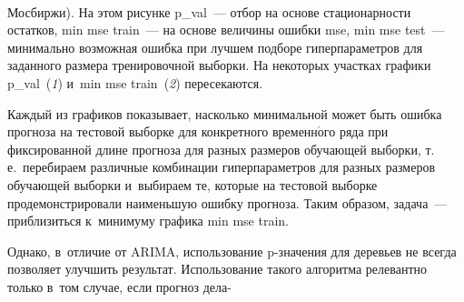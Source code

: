 \begin{figure*} %
\vspace*{9pt}
  \begin{center}  
    \mbox{%
\epsfxsize=102.865mm
}

\end{center}
\vspace*{-9pt}
    \label{pic2}
\end{figure*}

\begin{multicols}{2}

\noindent
 Мосбиржи). На этом рисунке p\_val~--- 
отбор на основе стационарности остатков, min mse train~--- на основе величины ошибки mse, min mse test~--- 
минимально возможная ошибка при лучшем подборе гиперпараметров для заданного размера тренировочной выборки. 
На некоторых участках графики p\_val~(\textit{1}) и~min mse train~(\textit{2}) пересекаются. 

Каждый из графиков показывает, 
насколько минимальной может быть ошибка прогноза на тестовой выборке для конкретного временн$\acute{\mbox{о}}$го 
ряда при фиксированной длине прогноза для разных размеров обучающей выборки, т.\,е.\ 
перебираем различные комбинации гиперпараметров для разных размеров обуча\-ющей выборки и~выбираем те, 
которые на тестовой выборке продемонстрировали наименьшую ошибку прогноза. Таким образом, задача~--- 
приблизиться к~минимуму графика  min mse train.



Однако, в~отличие от ARIMA, использование \mbox{p-зна}\-че\-ния для деревьев не всегда позволяет 
улучшить результат. Использование такого алгоритма релевантно только в~том случае, если прогноз 
дела-\linebreak\vspace*{-12pt}

\pagebreak

\end{multicols}

\begin{figure*} %
\vspace*{1pt}
  \begin{center}  
    \mbox{%
\epsfxsize=100.047mm
}

\end{center}
\vspace*{-9pt}
    \label{pic3}
\end{figure*}

